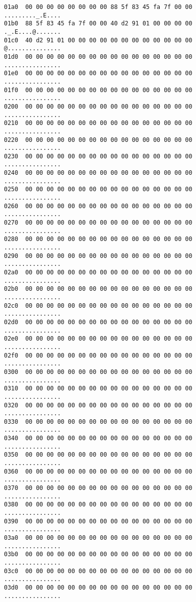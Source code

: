 \begin{lstlisting}
01a0  00 00 00 00 00 00 00 00 88 5f 83 45 fa 7f 00 00   ........._.E....
01b0  88 5f 83 45 fa 7f 00 00 40 d2 91 01 00 00 00 00   ._.E....@.......
01c0  40 d2 91 01 00 00 00 00 00 00 00 00 00 00 00 00   @...............
01d0  00 00 00 00 00 00 00 00 00 00 00 00 00 00 00 00   ................
01e0  00 00 00 00 00 00 00 00 00 00 00 00 00 00 00 00   ................
01f0  00 00 00 00 00 00 00 00 00 00 00 00 00 00 00 00   ................
0200  00 00 00 00 00 00 00 00 00 00 00 00 00 00 00 00   ................
0210  00 00 00 00 00 00 00 00 00 00 00 00 00 00 00 00   ................
0220  00 00 00 00 00 00 00 00 00 00 00 00 00 00 00 00   ................
0230  00 00 00 00 00 00 00 00 00 00 00 00 00 00 00 00   ................
0240  00 00 00 00 00 00 00 00 00 00 00 00 00 00 00 00   ................
0250  00 00 00 00 00 00 00 00 00 00 00 00 00 00 00 00   ................
0260  00 00 00 00 00 00 00 00 00 00 00 00 00 00 00 00   ................
0270  00 00 00 00 00 00 00 00 00 00 00 00 00 00 00 00   ................
0280  00 00 00 00 00 00 00 00 00 00 00 00 00 00 00 00   ................
0290  00 00 00 00 00 00 00 00 00 00 00 00 00 00 00 00   ................
02a0  00 00 00 00 00 00 00 00 00 00 00 00 00 00 00 00   ................
02b0  00 00 00 00 00 00 00 00 00 00 00 00 00 00 00 00   ................
02c0  00 00 00 00 00 00 00 00 00 00 00 00 00 00 00 00   ................
02d0  00 00 00 00 00 00 00 00 00 00 00 00 00 00 00 00   ................
02e0  00 00 00 00 00 00 00 00 00 00 00 00 00 00 00 00   ................
02f0  00 00 00 00 00 00 00 00 00 00 00 00 00 00 00 00   ................
0300  00 00 00 00 00 00 00 00 00 00 00 00 00 00 00 00   ................
0310  00 00 00 00 00 00 00 00 00 00 00 00 00 00 00 00   ................
0320  00 00 00 00 00 00 00 00 00 00 00 00 00 00 00 00   ................
0330  00 00 00 00 00 00 00 00 00 00 00 00 00 00 00 00   ................
0340  00 00 00 00 00 00 00 00 00 00 00 00 00 00 00 00   ................
0350  00 00 00 00 00 00 00 00 00 00 00 00 00 00 00 00   ................
0360  00 00 00 00 00 00 00 00 00 00 00 00 00 00 00 00   ................
0370  00 00 00 00 00 00 00 00 00 00 00 00 00 00 00 00   ................
0380  00 00 00 00 00 00 00 00 00 00 00 00 00 00 00 00   ................
0390  00 00 00 00 00 00 00 00 00 00 00 00 00 00 00 00   ................
03a0  00 00 00 00 00 00 00 00 00 00 00 00 00 00 00 00   ................
03b0  00 00 00 00 00 00 00 00 00 00 00 00 00 00 00 00   ................
03c0  00 00 00 00 00 00 00 00 00 00 00 00 00 00 00 00   ................
03d0  00 00 00 00 00 00 00 00 00 00 00 00 00 00 00 00   ................

\end{lstlisting}
